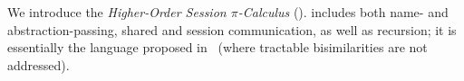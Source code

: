 \noindent 
We introduce the %
\emph{Higher-Order Session $\pi$-Calculus} (\HOp).
\HOp includes both name- and abstraction-passing, shared and session communication,  
as well as recursion; it is 
essentially 
the  language
proposed 
in~\cite{tlca07} (where tractable bisimilarities are not addressed). 

\smallskip





